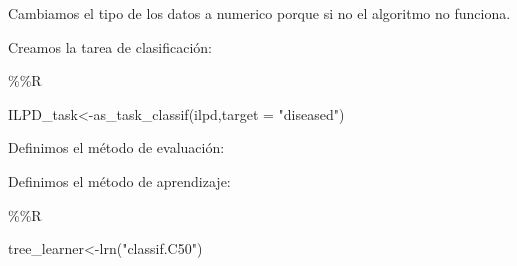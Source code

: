 \documentclass[
  11pt,
  a4paper,
]{article}
\newenvironment{Shaded}{\begin{snugshade}}{\end{snugshade}}
\newcommand{\AttributeTok}[1]{\textcolor[rgb]{0.77,0.63,0.00}{#1}}
\newcommand{\DecValTok}[1]{\textcolor[rgb]{0.00,0.00,0.81}{#1}}
\newcommand{\FloatTok}[1]{\textcolor[rgb]{0.00,0.00,0.81}{#1}}
\newcommand{\FunctionTok}[1]{\textcolor[rgb]{0.00,0.00,0.00}{#1}}
\newcommand{\NormalTok}[1]{#1}
\newcommand{\OtherTok}[1]{\textcolor[rgb]{0.56,0.35,0.01}{#1}}
\newcommand{\SpecialCharTok}[1]{\textcolor[rgb]{0.00,0.00,0.00}{#1}}
\newcommand{\StringTok}[1]{\textcolor[rgb]{0.31,0.60,0.02}{#1}}
\begin{document}
Cambiamos el tipo de los datos a numerico porque si no el algoritmo no
funciona.

\begin{Shaded}
\end{Shaded}

Creamos la tarea de clasificación:

\begin{Shaded}
\begin{Highlighting}[]
\SpecialCharTok{\%\%}\NormalTok{R}

\NormalTok{ILPD\_task}\OtherTok{\textless{}{-}}\FunctionTok{as\_task\_classif}\NormalTok{(ilpd,}\AttributeTok{target =} \StringTok{"diseased"}\NormalTok{)}
\end{Highlighting}
\end{Shaded}

Definimos el método de evaluación:

\begin{Shaded}
\end{Shaded}

Definimos el método de aprendizaje:

\begin{Shaded}
\begin{Highlighting}[]
\SpecialCharTok{\%\%}\NormalTok{R}

\NormalTok{tree\_learner}\OtherTok{\textless{}{-}}\FunctionTok{lrn}\NormalTok{(}\StringTok{"classif.C50"}\NormalTok{)}
\end{Highlighting}
\end{Shaded}
\end{document}
